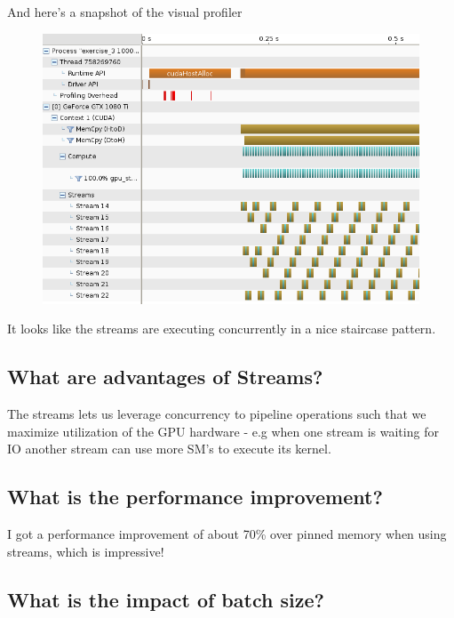 \documentclass{article}
\begin{document}
And here's a snapshot of the visual profiler

\begin{figure}[H]
  \centering
  \includegraphics[width=0.98\linewidth]{ex_3/nvvprof.png}
  \label{fig:}
\end{figure}

It looks like the streams are executing concurrently in a nice staircase pattern.

\subsection{What are advantages of Streams?}%
\label{sub:what_are_advantages_of_streams_}

The streams lets us leverage concurrency to pipeline operations such that we maximize utilization of the GPU hardware - e.g when one stream is waiting for IO another stream can use more SM's to execute its kernel. 

\subsection{What is the performance improvement?}%
\label{sub:what_is_the_performance_improvement_}


I got a performance improvement of about 70\% over pinned memory when using streams, which is impressive!

\subsection{What is the impact of batch size?}%
\label{sub:what_is_the_impact_of_batch_size}
\end{document}
